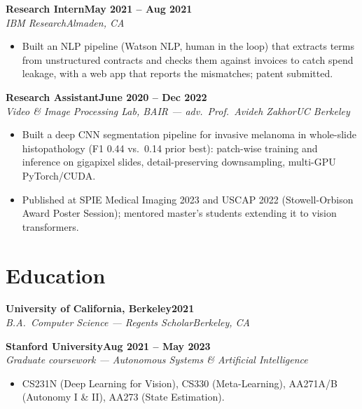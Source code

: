 \documentclass[10pt]{article}
\newcommand{\role}[4]{\textbf{#1}\hfill\textbf{#2}\\\textit{#3}\hfill\textit{#4}}
\begin{document}
\role{Research Intern}{May 2021 -- Aug 2021}{IBM Research}{Almaden, CA}
\begin{itemize}
\item Built an NLP pipeline (Watson NLP, human in the loop) that extracts terms from unstructured contracts and checks them against invoices to catch spend leakage, with a web app that reports the mismatches; patent submitted.
\end{itemize}

\role{Research Assistant}{June 2020 -- Dec 2022}{Video \& Image Processing Lab, BAIR --- adv.\ Prof.\ Avideh Zakhor}{UC Berkeley}
\begin{itemize}
\item Built a deep CNN segmentation pipeline for invasive melanoma in whole-slide histopathology (F1 0.44 vs.\ 0.14 prior best): patch-wise training and inference on gigapixel slides, detail-preserving downsampling, multi-GPU PyTorch/CUDA.
\item Published at SPIE Medical Imaging 2023 and USCAP 2022 (Stowell-Orbison Award Poster Session); mentored master's students extending it to vision transformers.
\end{itemize}


\section*{Education}

\role{University of California, Berkeley}{2021}{B.A.\ Computer Science --- Regents Scholar}{Berkeley, CA}

\role{Stanford University}{Aug 2021 -- May 2023}{Graduate coursework --- Autonomous Systems \& Artificial Intelligence}{}
\begin{itemize}
\item CS231N (Deep Learning for Vision), CS330 (Meta-Learning), AA271A/B (Autonomy I \& II), AA273 (State Estimation).
\end{itemize}
\end{document}
